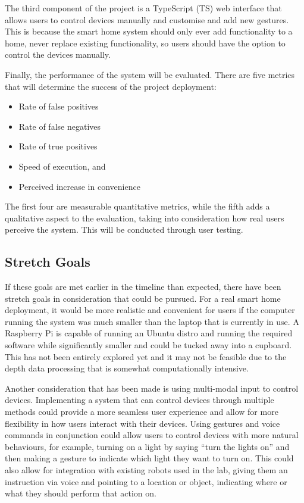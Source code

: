 The third component of the project is a TypeScript (TS) web interface that allows users to control devices manually and customise and add new gestures.
This is because the smart home system should only ever add functionality to a home, never replace existing functionality, so users should have the option to control the devices manually.

Finally, the performance of the system will be evaluated.
There are five metrics that will determine the success of the project deployment:
\begin{itemize}
    \item Rate of false positives
    \item Rate of false negatives
    \item Rate of true positives
    \item Speed of execution, and
    \item Perceived increase in convenience
\end{itemize}

The first four are measurable quantitative metrics, while the fifth adds a qualitative aspect to the evaluation, taking into consideration how real users perceive the system.
This will be conducted through user testing.

\subsection{Stretch Goals}
If these goals are met earlier in the timeline than expected, there have been stretch goals in consideration that could be pursued.
For a real smart home deployment, it would be more realistic and convenient for users if the computer running the system was much smaller than the laptop that is currently in use.
A Raspberry Pi is capable of running an Ubuntu distro and running the required software while significantly smaller and could be tucked away into a cupboard.
This has not been entirely explored yet and it may not be feasible due to the depth data processing that is somewhat computationally intensive.

Another consideration that has been made is using multi-modal input to control devices.
Implementing a system that can control devices through multiple methods could provide a more seamless user experience and allow for more flexibility in how users interact with their devices.
Using gestures and voice commands in conjunction could allow users to control devices with more natural behaviours, for example, turning on a light by saying ``turn the lights on'' and then making a gesture to indicate which light they want to turn on.
This could also allow for integration with existing robots used in the lab, giving them an instruction via voice and pointing to a location or object, indicating where or what they should perform that action on.

